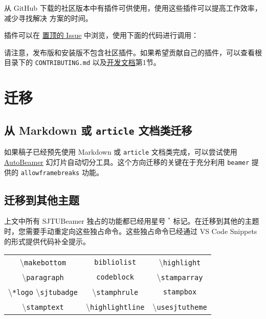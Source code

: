 \documentclass[
    UTF8,
    heading=true,
    12pt,
    a4paper
]{ctexrep}
\newcommand{\cmd}[1]{\textbackslash{}\texttt{#1}}
\newcommand{\cls}[1]{\texttt{#1}}
\newcommand{\env}[1]{\texttt{#1}}
\newcommand{\opt}[1]{\texttt{#1}}
\def\themename{\textsf{SJTUBeamer}}
\begin{document}
从 GitHub 下载的社区版本中有插件可供使用，使用这些插件可以提高工作效率，减少寻找解决
方案的时间。

插件可以在
\href{https://github.com/sjtug/SJTUBeamer/issues/
  81}
{置顶的 Issue} 中浏览，使用下面的代码进行调用：

请注意，发布版和安装版不包含社区插件。如果希望贡献自己的插件，可以查看根目录下的
\verb"CONTRIBUTING.md"
以及\href{run:sjtubeamerdevguide.pdf}{开发文档}第1节。


\chapter{迁移}

\section{从 Markdown 或 \cls{article} 文档类迁移}

如果稿子已经预先使用 Markdown 或 \cls{article} 文档类完成，可以尝试使用
\href{https://logcreative.github.io/AutoBeamer/}{
  AutoBeamer} 幻灯片自动切分工具。这个方向迁移的关键在于充分利用
\cls{beamer} 提供的 \opt{allowframebreaks} 功能。

\section{迁移到其他主题}

上文中所有 \themename{} 独占的功能都已经用星号 $^*$
标记。在迁移到其他的主题时，您需要手动重定向这些独占命令。这些独占命令已经通过 VS Code
Snippets 的形式提供代码补全提示。

\begin{table}[h]
  \centering
  \begin{tabular}{ccc}
    \hline
    \cmd{makebottom}            &
    \env{bibliolist}            & \cmd{highlight}
    \\
    \cmd{paragraph}             & \env{codeblock}
                                &
    \cmd{stamparray}
    \\
    \cmd{*logo} \cmd{sjtubadge} &
    \cmd{stamphrule}            & \env{stampbox}
    \\
    \cmd{stamptext}             &
    \cmd{highlightline}         &
    \cmd{usesjtutheme}
    \\
    \hline
  \end{tabular}
\end{table}
\end{document}
